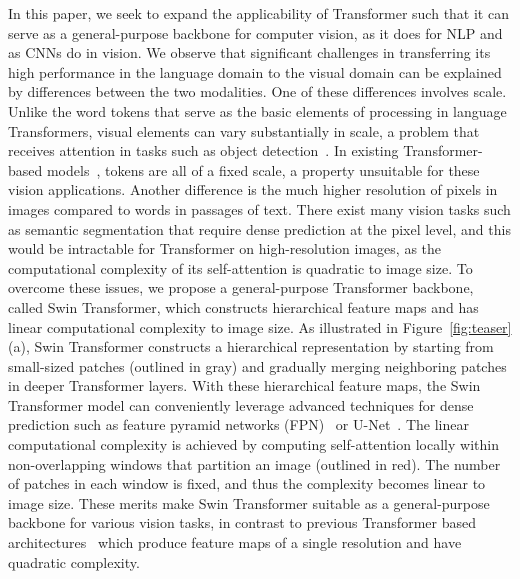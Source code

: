 \documentclass[10pt,twocolumn,letterpaper]{article}
\begin{document}
In this paper, we seek to expand the applicability of Transformer such that it can serve as a general-purpose backbone for computer vision, as it does for NLP and as CNNs do in vision. We observe that significant challenges in transferring its high performance in the language domain to the visual domain can be explained by differences between the two modalities. One of these differences involves scale. Unlike the word tokens that serve as the basic elements of processing in language Transformers, visual elements can vary substantially in scale, a problem that receives attention in tasks such as object detection~\cite{he2017fpn,singh2018snip,singh2018sniper}. In existing Transformer-based models~\cite{vaswani2017attention,dosovitskiy2020vit}, tokens are all of a fixed scale, a property unsuitable for these vision applications. 
Another difference is the much higher resolution of pixels in images compared to words in passages of text. There exist many vision tasks such as semantic segmentation that require dense prediction at the pixel level, and this would be intractable for Transformer on high-resolution images, as the computational complexity of its self-attention is quadratic to image size. 
To overcome these issues, we propose a general-purpose Transformer backbone, called Swin Transformer, which constructs hierarchical feature maps and has linear computational complexity to image size. As illustrated in Figure~\ref{fig:teaser}(a), Swin Transformer constructs a hierarchical representation by starting from small-sized patches (outlined in gray) and gradually merging neighboring patches in deeper Transformer layers. With these hierarchical feature maps, the Swin Transformer model can conveniently leverage advanced techniques for dense prediction such as feature pyramid networks (FPN)~\cite{he2017fpn} or U-Net~\cite{ronneberger2015unet}. The linear computational complexity is achieved by computing self-attention locally within non-overlapping windows that partition an image (outlined in red). The number of patches in each window is fixed, and thus the complexity becomes linear to image size. These merits make Swin Transformer suitable as a general-purpose backbone for various vision tasks, in contrast to previous Transformer based architectures~\cite{dosovitskiy2020vit} which produce feature maps of a single resolution and have quadratic complexity.
\end{document}
